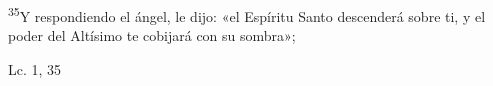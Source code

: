\documentclass[../../rosario.tex]{subfiles}
\begin{document}
    \textsuperscript{35}Y respondiendo el ángel, le dijo: «el Espíritu Santo descenderá sobre ti, y el poder del Altísimo te cobijará con su sombra»;
    \begin{flushright}
    Lc. 1, 35
    \end{flushright}
\end{document}
